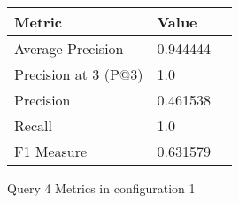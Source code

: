 \begin{figure}[H]
\begin{center}
\begin{tabular}{lll}
\toprule
{}                      Metric &         Value \\
\midrule
     Average Precision &  0.944444 \\
  Precision at 3 (P@3) &       1.0 \\
             Precision &  0.461538 \\
                Recall &       1.0 \\
            F1 Measure &  0.631579 \\
\bottomrule
\end{tabular}
\end{center}
\caption{Query 4 Metrics in configuration 1}
\label{fig:query_4_metrics_config_1}
\end{figure}